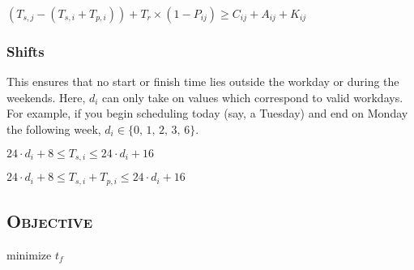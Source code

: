 \documentclass{article}
\begin{document}
$(T_{s,j} - (T_{s,i} + T_{p,i})) + T_r \times (1 - P_{ij}) \geq C_{ij} + A_{ij} + K_{ij}$

\subsubsection*{Shifts}
\noindent This ensures that no start or finish time lies outside the workday or during the weekends. Here, $d_i$ can only take on values which correspond to valid workdays. For example, if you begin scheduling today (say, a Tuesday) and end on Monday the following week, $d_i \in \{0,\, 1,\, 2,\, 3,\, 6\}$.

$24 \cdot d_i + 8 \leq T_{s,i} \leq 24 \cdot d_i + 16$

$24 \cdot d_i + 8 \leq T_{s,i} + T_{p,i} \leq 24 \cdot d_i + 16$

\subsection*{\textsc{Objective}}
minimize $t_f$
\end{document}
